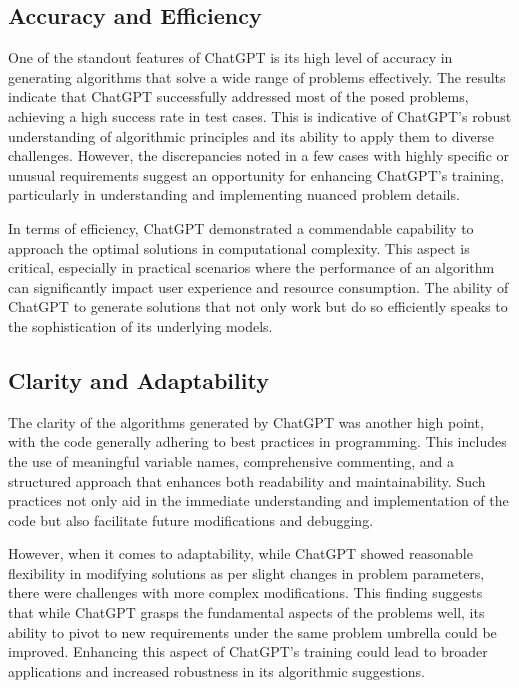 \documentclass{article}
\begin{document}
\subsection{Accuracy and Efficiency}

One of the standout features of ChatGPT is its high level of accuracy in generating algorithms that solve a wide range of problems effectively. The results indicate that ChatGPT successfully addressed most of the posed problems, achieving a high success rate in test cases. This is indicative of ChatGPT’s robust understanding of algorithmic principles and its ability to apply them to diverse challenges. However, the discrepancies noted in a few cases with highly specific or unusual requirements suggest an opportunity for enhancing ChatGPT’s training, particularly in understanding and implementing nuanced problem details.

In terms of efficiency, ChatGPT demonstrated a commendable capability to approach the optimal solutions in computational complexity. This aspect is critical, especially in practical scenarios where the performance of an algorithm can significantly impact user experience and resource consumption. The ability of ChatGPT to generate solutions that not only work but do so efficiently speaks to the sophistication of its underlying models.

\subsection{Clarity and Adaptability}

The clarity of the algorithms generated by ChatGPT was another high point, with the code generally adhering to best practices in programming. This includes the use of meaningful variable names, comprehensive commenting, and a structured approach that enhances both readability and maintainability. Such practices not only aid in the immediate understanding and implementation of the code but also facilitate future modifications and debugging.

However, when it comes to adaptability, while ChatGPT showed reasonable flexibility in modifying solutions as per slight changes in problem parameters, there were challenges with more complex modifications. This finding suggests that while ChatGPT grasps the fundamental aspects of the problems well, its ability to pivot to new requirements under the same problem umbrella could be improved. Enhancing this aspect of ChatGPT’s training could lead to broader applications and increased robustness in its algorithmic suggestions.
\end{document}
